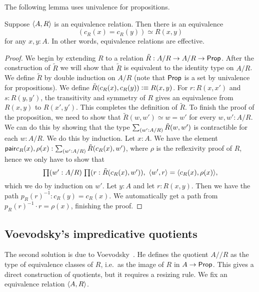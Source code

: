 The following lemma uses univalence for propositions.

\begin{lem}\label{lem:sets_exact}
Suppose ${\langle A,R\rangle}$ is an equivalence relation. Then there is an
equivalence
\begin{equation*}
(c_R(x)= c_R(y))\simeq R(x,y)
\end{equation*}
for any $x,y:A$. In other words, equivalence relations are effective.
\end{lem}

\begin{proof}
We begin by extending $R$ to a relation $\tilde{R}:A/R\to A/R\to\mathsf{Prop}$. After
the construction of $\tilde{R}$ we will show that $\tilde{R}$ is equivalent
to the identity type on $A/R$. We define $\tilde{R}$ by double induction on
$A/R$ (note that $\mathsf{Prop}$ is a set by univalence for propositions). We
define $\tilde{R}(c_R(x),c_R(y)) \vcentcolon\equiv R(x,y)$. For $r:R(x,x')$ and $s:R(y,y')$,
the transitivity and symmetry 
of $R$ gives an equivalence from $R(x,y)$ to $R(x',y')$. This completes the
definition of $\tilde{R}$. To finish the proof of the proposition, we need
to show that $\tilde{R}(w,w')\simeq w= w'$ for every $w,w':A/R$. We can
do this by showing that the type $\sm{w':A/R} \tilde{R}(w,w')$ is contractible for
each $w:A/R$. We do this by induction. Let $x:A$. We have the element
$\pair{c_R(x),\rho(x)}:\sm{w':A/R} \tilde{R}(c_R(x),w')$, where $\rho$ is
the reflexivity proof of $R$, hence we only
have to show that
\begin{equation*}
\prd{w':A/R}{r:\tilde{R}(c_R(x),w')} \pairr{w',r}=\pairr{c_R(x),\rho(x)},
\end{equation*}
which we do by induction on $w'$. Let $y:A$ and let $r:R(x,y)$. Then we have
the path $p_R(r)^{-1}:c_R(y)= c_R(x)$. We automatically get a path from
$p_R(r)^{-1}\cdot r=\rho(x)$, finishing the proof.
\end{proof}

\subsection{Voevodsky's impredicative quotients}\label{sec:resizing}
The second solution is due to Voevodsky~\cite{pelayo2013preliminary}.
He defines the quotient $A/\!\!/R $ as the type of equivalence classes of $R$, 
i.e.\ as the image of $R$ in $A\to\mathsf{Prop}$. This gives a direct
construction of quotients, but it requires a resizing rule. We fix an equivalence relation ${\langle A,R\rangle}$.


